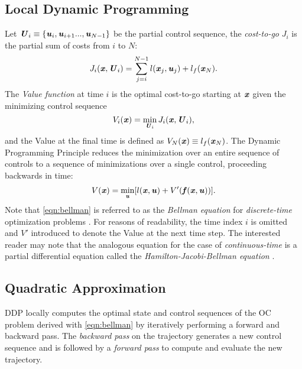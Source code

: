 \subsection{Local Dynamic Programming}
Let $\bm{\mathit{U}}_i\equiv\{\bm{\mathit{u}}_i,\bm{\mathit{u}}_{i+1}...,\bm{\mathit{u}}_{N-1}\}$ be the partial control sequence, the \textit{cost-to-go} $J_i$ is the partial sum of costs from $i$ to $N$: 
\begin{equation*}\label{costToGo}
J_i(\bm{\mathit{x}}, \bm{\mathit{U}}_i)=\sum_{j=i}^{N-1}l(\bm{\mathit{x}}_j,\bm{\mathit{u}}_j)+l_f(\bm{\mathit{x}}_N).
\end{equation*}
The \textit{Value function} at time $i$ is the optimal cost-to-go starting at $\bm{\mathit{x}}$ given the minimizing control sequence 
\begin{equation*}\label{eqn:value}
V_i(\bm{\mathit{x}})=\min_{\bm{\mathit{U}}_i}J_i(\bm{\mathit{x}}, \bm{\mathit{U}}_i),
\end{equation*}
and the Value at the final time is defined as $V_N(\bm{\mathit{x}})\equiv l_f(\bm{\mathit{x}}_N)$. The Dynamic Programming Principle \citep{bellman1966dynamic} reduces the minimization over an entire sequence of controls to a sequence of minimizations over a single control, proceeding backwards in time: 
\begin{equation}\label{eqn:bellman}
V(\bm{\mathit{x}})=\min_{\bm{\mathit{u}}}[l(\bm{\mathit{x}}, \bm{\mathit{u}})+V'(\bm{\mathit{f}}(\bm{\mathit{x}},\bm{\mathit{u}}))].
\end{equation}
Note that \cref{eqn:bellman} is referred to as the \textit{Bellman equation} for \textit{discrete-time} optimization problems \citep{kirk2004optimal}. For reasons of readability, the time index $i$ is omitted and $V'$ introduced to denote the Value at the next time step. The interested reader may note that the analogous equation for the case of \textit{continuous-time} is a partial differential equation called the \textit{Hamilton-Jacobi-Bellman equation} \citep{underactuatedCourse2020, kamien2012dynamic}.

\subsection{Quadratic Approximation}
\gls{DDP} locally computes the optimal state and control sequences of the \gls{OC} problem derived with \cref{eqn:bellman} by iteratively performing a forward and backward pass. The \textit{backward pass} on the trajectory generates a new control sequence and is followed by a \textit{forward pass} to compute and evaluate the new trajectory.


